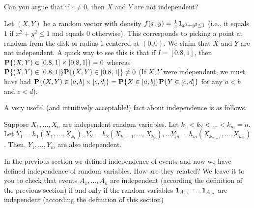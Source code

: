 \documentclass[preprint,  11pt]{amsart}
\begin{document}
Can you argue that if $c\not=0$, then $X$ and $Y$ are not independent?
\eeg


\beg Let $(X,Y)$ be a random vector with density $f(x,y)=\frac{1}{\pi}\one_{x^{2}+y^{2}\le 1}$ (i.e., it equals $1$ if $x^{2}+y^{2}\le 1$ and equals  $0$ otherwise). This corresponds to picking a point at random from the disk of radius $1$ centered at $(0,0)$. We claim that $X$ and $Y$ are not independent. A quick way to see this is that if $I=[0.8,1]$, then $\P\{(X,Y)\in [0.8,1]\times [0.8,1]\}=0$ whereas $\P\{(X,Y)\in [0.8,1]\}\P\{(X,Y)\in [0.8,1]\}\not= 0$ (If $X,Y$ were independent, we must have had $\P\{(X,Y)\in [a,b]\times [c,d]\}=\P\{X\in [a,b]\}\P\{Y\in [c,d]\}$ for any $a<b$ and $c<d$).
\eeg

A very useful (and intuitively acceptable!) fact about independence is as follows.

 Suppose $X_{1},\ldots ,X_{n}$ are independent random variables. Let $k_{1}<k_{2}<\ldots <k_{m}=n$. Let $Y_{1}=h_{1}(X_{1},\ldots ,X_{k_{1}})$, $Y_{2}=h_{2}(X_{k_{1}+{1}},\ldots ,X_{k_{2}}), \ldots Y_{m}=h_{m}(X_{k_{m-1}},\ldots ,X_{k_{m}})$. Then, $Y_{1},\ldots ,Y_{m}$ are also independent.


\berk In the previous section we defined independence of events and now we have defined independence of random variables. How are they related? We leave it to you to check that events $A_{1},\ldots ,A_{n}$ are independent (according the definition of the previous section) if and only if the random variables $\one_{A_{1}},\ldots ,\one_{A_{m}}$ are independent (according the definition of this section)
\eerk
\end{document}
